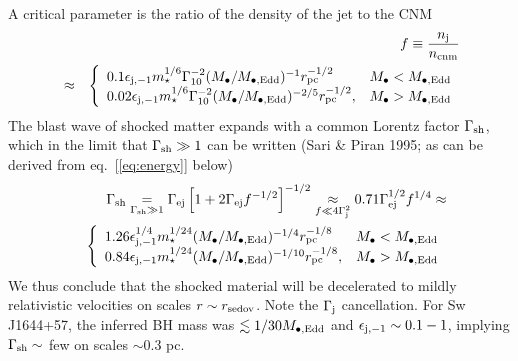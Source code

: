 \documentclass[usenatbib,fleqn]{mnras}
\begin{document}
A critical parameter is the ratio of the density of the jet to the CNM
\begin{eqnarray}
&&f \equiv \frac{n_{\rm j}}{n_{\rm cnm}}  \nonumber \\
&\approx & \left\{
\begin{array}{lr}
0.1\epsilon_{\rm j,-1}m_{\star}^{1/6}\Gamma_{10}^{-2}(M_{\bullet}/M_{\bullet, \rm Edd})^{-1}r_{\rm pc}^{-1/2}
&  M_{\bullet} < M_{\bullet, \rm Edd} \\
0.02\epsilon_{\rm j,-1}m_{\star}^{1/6}\Gamma_{10}^{-2}(M_{\bullet}/M_{\bullet, \rm Edd})^{-2/5}r_{\rm pc}^{-1/2}
,& M_{\bullet} > M_{\bullet, \rm Edd}\\
\end{array}
\right. 
\label{eq:f}
\end{eqnarray}
The blast wave of shocked matter expands with a common Lorentz factor $\Gamma_{\rm sh}$, which 
in the limit that $\Gamma_{\rm sh} \gg 1$ can be written (Sari \& Piran 1995; as can be derived from eq.~[\ref{eq:energy}] below)
\begin{eqnarray}
&&\Gamma_{\rm sh} \underset{\Gamma_{\rm sh} \gg 1}= \Gamma_{\rm ej}\left[1 + 2\Gamma_{\rm ej}f^{-1/2}\right]^{-1/2} \underset{f \ll 4\Gamma_{\rm j}^{2}}\approx 0.71\Gamma_{\rm ej}^{1/2}f^{1/4} \approx \nonumber \\
&&\left\{
\begin{array}{lr}
1.26\epsilon_{\rm j,-1}^{1/4}m_{\star}^{1/24}(M_{\bullet}/M_{\bullet, \rm Edd})^{-1/4}r_{\rm pc}^{-1/8}
&  M_{\bullet} < M_{\bullet, \rm Edd} \\
0.84\epsilon_{\rm j,-1}m_{\star}^{1/24}(M_{\bullet}/M_{\bullet, \rm Edd})^{-1/10}r_{\rm pc}^{-1/8}
,& M_{\bullet} > M_{\bullet, \rm Edd}\\
\end{array}
\right. 
\label{eq:gammash}
\end{eqnarray}
We thus conclude that the shocked material will be decelerated to mildly relativistic velocities on scales $r \sim r_{\rm sedov}$.  Note the $\Gamma_{\rm j}$ cancellation.  For Sw J1644+57, the inferred BH mass was $\lesssim 1/30M_{\bullet,\rm Edd}$ and $\epsilon_{\rm j,-1} \sim 0.1-1$, implying $\Gamma_{\rm sh} \sim $ few on scales $\sim 0.3$ pc.
\end{document}
